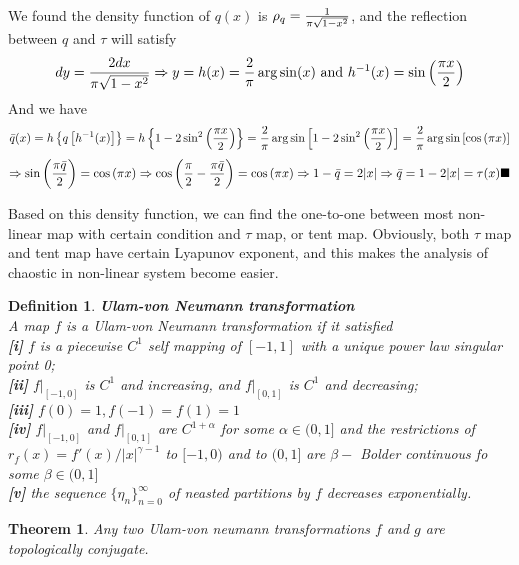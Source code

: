 \documentclass[12pt]{article}
\theoremstyle{plain}
\newtheorem{theorem}{\textbf{Theorem}}[section]
\newtheorem{definition}{{\color{red}\textbf{Definition}}}[section]
\begin{document}
We found the density function of $q(x)$ is $\rho_q ={1\over \pi\sqrt{1 - x^2}}$, and the reflection between $q$ and $\tau$ will satisfy 
$$
dy = {2 dx \over\pi \sqrt{1 - x^2}} \Rightarrow y = h(x) = {2\over \pi}\arg\sin(x) \text{ and }h^{-1}(x) = \sin\left({\pi x \over 2}\right)
$$
And we have 
$$
\bar q(x) = h\left\{q\left[h^{-1}(x)\right]\right\} 
= h\left\{1 - 2 \sin^2\left({\pi x \over 2}\right)\right\} 
= {2\over \pi}\arg\sin\left[1 - 2 \sin^2\left({\pi x \over 2}\right)\right]
= {2\over \pi}\arg\sin\left[\cos\left({\pi x}\right)\right]
$$
$$
\Rightarrow \sin {\left(\pi \bar q \over 2\right)} = \cos {\left(\pi x\right)} \Rightarrow \cos \left({\pi \over 2} - {\pi \bar q \over 2}\right) = \cos {\left(\pi x\right)}  \Rightarrow 1 - \bar q = 2|x| \Rightarrow \bar q = 1 - 2|x| = \tau(x) \blacksquare
$$







Based on this density function, we can find the one-to-one between most non-linear map with certain condition and $\tau$ map, or tent map. Obviously, both $\tau$ map and tent map have certain Lyapunov exponent, and this makes the analysis of chaostic in non-linear system become easier.

\begin{definition}\textbf{Ulam-von Neumann transformation}
\\\noindent A map $f$ is a Ulam-von Neumann transformation if it satisfied
\\\noindent \textbf{[i]} $f$ is a piecewise $C^1$ self mapping of $[-1, 1]$ with a unique power law singular point 0;
\\\noindent \textbf{[ii]} $f|_{[-1, 0]}$ is $C^1$ and increasing, and $f|_{[0, 1]}$ is $C^1$ and decreasing;
\\\noindent \textbf{[iii]} $f(0) = 1, f(-1) = f(1) = 1$
\\\noindent \textbf{[iv]} $f|_{[-1, 0]}$ and $f|_{[0, 1]}$ are $C^{1 +\alpha}$ for some $\alpha \in (0, 1]$ and the restrictions of $r_f(x) = f'(x) / |x|^{\gamma - 1}$ to $[-1, 0)$ and to $(0, 1]$ are $\beta -$ Bolder continuous fo some $\beta \in (0, 1]$
\\\noindent \textbf{[v]} the sequence $\{\eta_n\}_{n = 0}^{\infty}$ of neasted partitions by $f$ decreases exponentially.
\end{definition}

\begin{theorem} Any two Ulam-von neumann transformations $f$ and $g$ are topologically conjugate.
\end{theorem}
\end{document}
